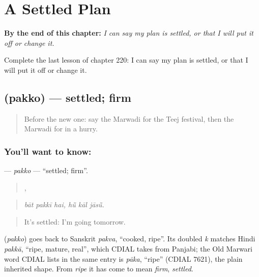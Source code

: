 
\chapter{A Settled Plan}
\label{ch:mw-a-settled-plan}

\begin{chapteropening}
\textbf{By the end of this chapter:} \emph{I can say my plan is settled, or that I will put it off or change it.}

Complete the last lesson of chapter 220: I can say my plan is settled, or that I will put it off or change it.
\end{chapteropening}

\section[\texorpdfstring{\mw{पक्को} (pakko)}{पक्को (pakko)}]{ (pakko) — settled; firm}

\label{lesson:MW-C220-pakko}



\begin{quote}
Before the new one: say the Marwadi for the Teej festival, then the Marwadi for in a hurry.
\end{quote}

\subsection*{You'll want to know: }
\textbf{} — \emph{pakko} — \textquotedblleft{}settled; firm\textquotedblright{}.

\begin{quote}
  ,   
\end{quote}

\begin{quote}
\emph{bāt pakkī hai, hū̃ kāl jāsū̃.}
\end{quote}

\begin{quote}
It's settled: I'm going tomorrow.
\end{quote}

\begin{cousinweb}
\textbf{} (\emph{pakko}) goes back to Sanskrit \emph{pakva}, \textquotedblleft{}cooked, ripe\textquotedblright{}. Its doubled \emph{k} matches Hindi \emph{pakkā}, \textquotedblleft{}ripe, mature, real\textquotedblright{}, which CDIAL takes from Panjabi; the Old Marwari word CDIAL lists in the same entry is \emph{pāka}, \textquotedblleft{}ripe\textquotedblright{} (CDIAL 7621), the plain inherited shape. From \emph{ripe} it has come to mean \emph{firm}, \emph{settled}.
\end{cousinweb}

